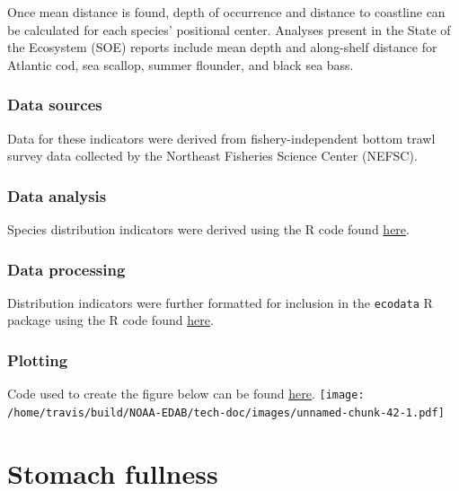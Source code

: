 \documentclass[
]{book}
\begin{document}
Once mean distance is found, depth of occurrence and distance to coastline can be calculated for each species' positional center. Analyses present in the State of the Ecosystem (SOE) reports include mean depth and along-shelf distance for Atlantic cod, sea scallop, summer flounder, and black sea bass.

\hypertarget{data-sources-38}{%
\subsection{Data sources}\label{data-sources-38}}

Data for these indicators were derived from fishery-independent bottom trawl survey data collected by the Northeast Fisheries Science Center (NEFSC).

\hypertarget{data-analysis-36}{%
\subsection{Data analysis}\label{data-analysis-36}}

Species distribution indicators were derived using the R code found \href{https://github.com/NOAA-EDAB/tech-doc/blob/master/R/stored_scripts/species_distribution_analysis.R}{here}.

\hypertarget{data-processing-27}{%
\subsection{Data processing}\label{data-processing-27}}

Distribution indicators were further formatted for inclusion in the \texttt{ecodata} R package using the R code found \href{https://github.com/NOAA-EDAB/ecodata/blob/master/data-raw/get_species_dist.R}{here}.

\hypertarget{plotting-31}{%
\subsection{Plotting}\label{plotting-31}}

Code used to create the figure below can be found \href{https://github.com/NOAA-EDAB/ecodata/blob/master/chunk-scripts/macrofauna.Rmd-spec-dist.R}{here}.
\texttt{[image: /home/travis/build/NOAA-EDAB/tech-doc/images/unnamed-chunk-42-1.pdf]}

\hypertarget{stomach-fullness}{%
\chapter{Stomach fullness}\label{stomach-fullness}}
\end{document}
